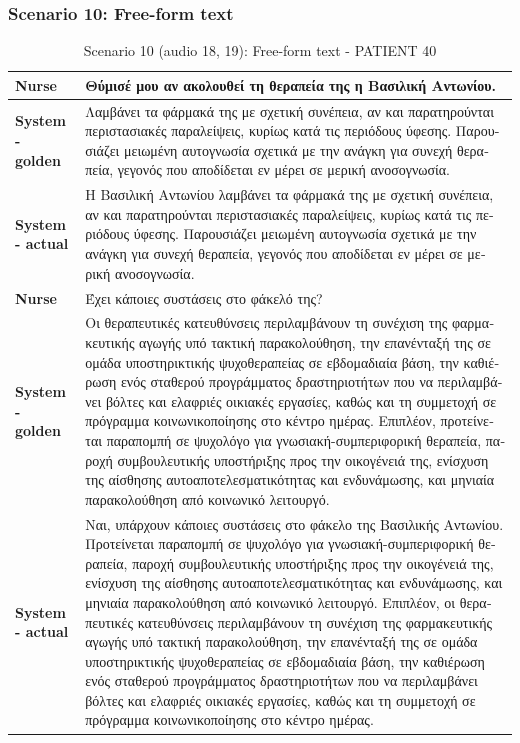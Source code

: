 \subsubsection{Scenario 10: Free-form text}
\begin{table}[H]
\centering
\renewcommand{\arraystretch}{1.5} 
\begin{tabular}{|>{\bfseries}l|p{11cm}|}
\hline
Nurse & \textgreek{Θύμισέ μου αν ακολουθεί τη θεραπεία της η Βασιλική Αντωνίου.} \\
\hline
System - golden & \textgreek{Λαμβάνει τα φάρμακά της με σχετική συνέπεια, αν και παρατηρούνται περιστασιακές παραλείψεις, κυρίως κατά τις περιόδους ύφεσης. 
Παρουσιάζει μειωμένη αυτογνωσία σχετικά με την ανάγκη για συνεχή θεραπεία, γεγονός που αποδίδεται εν μέρει σε μερική ανοσογνωσία.} \\
\hline
System - actual & \textgreek{Η Βασιλική Αντωνίου λαμβάνει τα φάρμακά της με σχετική συνέπεια, αν και παρατηρούνται περιστασιακές παραλείψεις, κυρίως κατά τις περιόδους ύφεσης. Παρουσιάζει μειωμένη αυτογνωσία σχετικά με την ανάγκη για συνεχή θεραπεία, γεγονός που αποδίδεται εν μέρει σε μερική ανοσογνωσία.} \\
\hline
Nurse & \textgreek{Έχει κάποιες συστάσεις στο φάκελό της?} \\
\hline
System - golden & \textgreek{Οι θεραπευτικές κατευθύνσεις περιλαμβάνουν τη συνέχιση της φαρμακευτικής αγωγής υπό τακτική παρακολούθηση, την επανένταξή της σε ομάδα υποστηρικτικής ψυχοθεραπείας σε εβδομαδιαία βάση, την καθιέρωση ενός σταθερού προγράμματος δραστηριοτήτων που να περιλαμβάνει βόλτες και ελαφριές οικιακές εργασίες, καθώς και τη συμμετοχή σε πρόγραμμα κοινωνικοποίησης στο κέντρο ημέρας. 
Επιπλέον, προτείνεται παραπομπή σε ψυχολόγο για γνωσιακή-συμπεριφορική θεραπεία, παροχή συμβουλευτικής υποστήριξης προς την οικογένειά της, ενίσχυση της αίσθησης αυτοαποτελεσματικότητας και ενδυνάμωσης, και μηνιαία παρακολούθηση από κοινωνικό λειτουργό.} \\
\hline
System - actual & \textgreek{Ναι, υπάρχουν κάποιες συστάσεις στο φάκελο της Βασιλικής Αντωνίου. Προτείνεται παραπομπή σε ψυχολόγο για γνωσιακή-συμπεριφορική θεραπεία, παροχή συμβουλευτικής υποστήριξης προς την οικογένειά της, ενίσχυση της αίσθησης αυτοαποτελεσματικότητας και ενδυνάμωσης, και μηνιαία παρακολούθηση από κοινωνικό λειτουργό. Επιπλέον, οι θεραπευτικές κατευθύνσεις περιλαμβάνουν τη συνέχιση της φαρμακευτικής αγωγής υπό τακτική παρακολούθηση, την επανένταξή της σε ομάδα υποστηρικτικής ψυχοθεραπείας σε εβδομαδιαία βάση, την καθιέρωση ενός σταθερού προγράμματος δραστηριοτήτων που να περιλαμβάνει βόλτες και ελαφριές οικιακές εργασίες, καθώς και τη συμμετοχή σε πρόγραμμα κοινωνικοποίησης στο κέντρο ημέρας.} \\
\hline
\end{tabular}
\caption{Scenario 10 (audio 18, 19): Free-form text - PATIENT 40}
\end{table}

